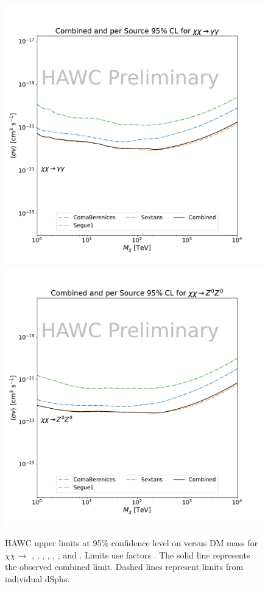 \begin{figure}[h]
{    \includegraphics[scale=0.21]{figures/mtd_hawc_dm/results/Combined95_New_duck_gammagamma_.pdf}
    \includegraphics[scale=0.21]{figures/mtd_hawc_dm/results/Combined95_New_duck_zz_.pdf}
    }
    \caption{HAWC upper limits at 95\% confidence level on \sv versus DM mass for $\chi\chi \rightarrow $ , \parpar{\nu_\mu}, \parpar{\nu_\tau}, , \parpar{\mu}, \parpar{\tau}, \pp{\gamma} and . Limits use \LS \J factors \cite{DM_Strigari20}. The solid line represents the observed combined limit. Dashed lines represent limits from individual dSphs.}
\label{fig:mtd_limits_2of2}
\end{figure}

